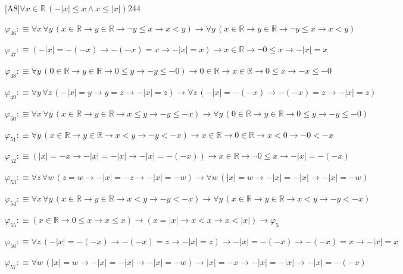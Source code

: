 \begin{fullproof}{[A8]}{$\forall x \in \mathbb{R}\,(-\lvert x \rvert \leq x \land x \leq \lvert x \rvert)$}{244}
\begin{abbrevlist}
\item $\varphi_{46} :\equiv \forall x\,\forall y\,(x \in \mathbb{R} \to y \in \mathbb{R} \to \neg y \leq x \to x < y) \to \forall y\,(x \in \mathbb{R} \to y \in \mathbb{R} \to \neg y \leq x \to x < y)$
\item $\varphi_{47} :\equiv (-\lvert x \rvert = -(-x) \to -(-x) = x \to -\lvert x \rvert = x) \to x \in \mathbb{R} \to \neg 0 \leq x \to -\lvert x \rvert = x$
\item $\varphi_{48} :\equiv \forall y\,(0 \in \mathbb{R} \to y \in \mathbb{R} \to 0 \leq y \to -y \leq -0) \to 0 \in \mathbb{R} \to x \in \mathbb{R} \to 0 \leq x \to -x \leq -0$
\item $\varphi_{49} :\equiv \forall y\,\forall z\,(-\lvert x \rvert = y \to y = z \to -\lvert x \rvert = z) \to \forall z\,(-\lvert x \rvert = -(-x) \to -(-x) = z \to -\lvert x \rvert = z)$
\item $\varphi_{50} :\equiv \forall x\,\forall y\,(x \in \mathbb{R} \to y \in \mathbb{R} \to x \leq y \to -y \leq -x) \to \forall y\,(0 \in \mathbb{R} \to y \in \mathbb{R} \to 0 \leq y \to -y \leq -0)$
\item $\varphi_{51} :\equiv \forall y\,(x \in \mathbb{R} \to y \in \mathbb{R} \to x < y \to -y < -x) \to x \in \mathbb{R} \to 0 \in \mathbb{R} \to x < 0 \to -0 < -x$
\item $\varphi_{52} :\equiv (\lvert x \rvert = -x \to -\lvert x \rvert = -\lvert x \rvert \to -\lvert x \rvert = -(-x)) \to x \in \mathbb{R} \to \neg 0 \leq x \to -\lvert x \rvert = -(-x)$
\item $\varphi_{53} :\equiv \forall z\,\forall w\,(z = w \to -\lvert x \rvert = -z \to -\lvert x \rvert = -w) \to \forall w\,(\lvert x \rvert = w \to -\lvert x \rvert = -\lvert x \rvert \to -\lvert x \rvert = -w)$
\item $\varphi_{54} :\equiv \forall x\,\forall y\,(x \in \mathbb{R} \to y \in \mathbb{R} \to x < y \to -y < -x) \to \forall y\,(x \in \mathbb{R} \to y \in \mathbb{R} \to x < y \to -y < -x)$
\item $\varphi_{55} :\equiv (x \in \mathbb{R} \to 0 \leq x \to x \leq x) \to (x = \lvert x \rvert \to x < x \to x < \lvert x \rvert) \to \varphi_{5}$
\item $\varphi_{56} :\equiv \forall z\,(-\lvert x \rvert = -(-x) \to -(-x) = z \to -\lvert x \rvert = z) \to -\lvert x \rvert = -(-x) \to -(-x) = x \to -\lvert x \rvert = x$
\item $\varphi_{57} :\equiv \forall w\,(\lvert x \rvert = w \to -\lvert x \rvert = -\lvert x \rvert \to -\lvert x \rvert = -w) \to \lvert x \rvert = -x \to -\lvert x \rvert = -\lvert x \rvert \to -\lvert x \rvert = -(-x)$

\end{abbrevlist}
\end{fullproof}
